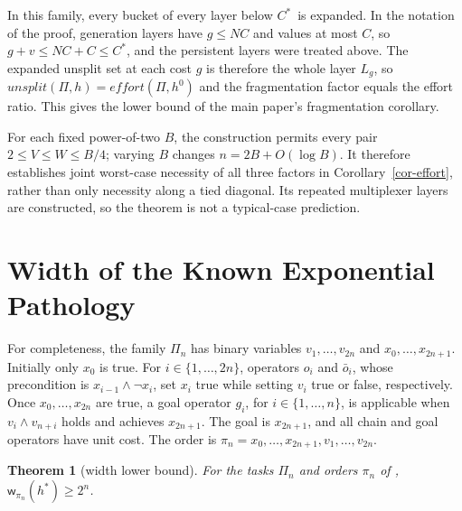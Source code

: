 \documentclass[letterpaper]{article}
\newcommand{\task}{\ensuremath{\Pi}}
\newcommand{\hstar}{\ensuremath{h^{*}}}
\newcommand{\hblind}{\ensuremath{h^{0}}}
\newcommand{\copt}{\ensuremath{C^{*}}}
\newcommand{\width}{\ensuremath{\mathsf{w}}}
\newcommand{\values}{\ensuremath{V}}
\newcommand{\effort}{\ensuremath{\mathit{effort}}}
\newcommand{\unioneffort}{\ensuremath{\mathit{unsplit}}}
\theoremstyle{plain}
\newtheorem{theorem}{Theorem}
\theoremstyle{definition}
\theoremstyle{remark}
\begin{document}
In this family, every bucket of every layer below \copt\ is expanded. In the
notation of the proof, generation layers have $g\leq NC$ and values at most $C$, so
$g+v\leq NC+C\leq\copt$, and the persistent layers were treated above. The
expanded unsplit set at each cost $g$ is therefore the whole layer $L_g$, so
$\unioneffort(\task,h)=\effort(\task,\hblind)$ and the fragmentation factor
equals the effort ratio. This gives the lower bound of the main paper's
fragmentation corollary.

For each fixed power-of-two $B$, the construction permits every pair
$2\leq\values\leq W\leq B/4$; varying $B$ changes
$n=2B+O(\log B)$. It therefore establishes joint worst-case necessity of all
three factors in Corollary~\ref{cor-effort}, rather than only necessity along
a tied diagonal. Its repeated multiplexer layers are constructed, so the theorem
is not a typical-case prediction.

\section{Width of the Known Exponential Pathology}

For completeness, the family $\task_n$ has binary variables
$v_1,\dots,v_{2n}$ and $x_0,\dots,x_{2n+1}$. Initially only $x_0$ is
true. For $i\in\{1,\ldots,2n\}$, operators $o_i$ and $\bar o_i$, whose precondition is
$x_{i-1}\wedge\neg x_i$, set $x_i$ true while setting $v_i$ true or
false, respectively. Once $x_0,\dots,x_{2n}$ are true, a goal operator
$g_i$, for $i\in\{1,\ldots,n\}$, is applicable when
$v_i\wedge v_{n+i}$ holds and achieves $x_{2n+1}$. The goal is
$x_{2n+1}$, and all chain and goal operators have unit cost. The order is
$\pi_n=x_0,\dots,x_{2n+1},v_1,\dots,v_{2n}$.

\begin{theorem}[width lower bound]
\label{thm-lb}
For the tasks $\task_n$ and orders $\pi_n$ of
\citet{speck-et-al-icaps2020},
$\width_{\pi_n}(\hstar) \geq 2^{n}$.
\end{theorem}
\end{document}
